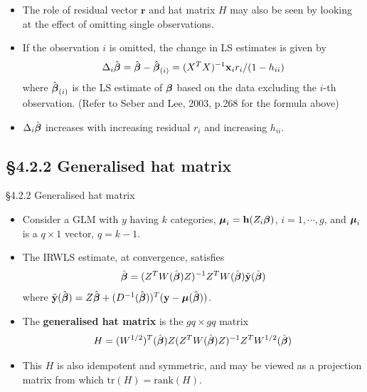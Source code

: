 \documentclass{beamer}
\newcommand{\currentsubsection}{}
\let\oldsubsection\subsection
\renewcommand{\subsection}[1]{\oldsubsection{#1}\renewcommand{\currentsubsection}{#1}}
\begin{document}
\begin{frame}
\begin{itemize}
\item
The role of residual vector $\textbf{r}$ and hat matrix $H$ may also be seen by looking at the effect of
omitting single observations.
\item
If the observation $i$ is omitted, the change in LS estimates is given by
$$\Delta_i\hat{\mbox{\boldmath $\beta$}}=\hat{\mbox{\boldmath $\beta$}}-\hat{\mbox{\boldmath $\beta$}}_{(i)}
=(X^TX)^{-1}\textbf{x}_ir_i/(1-h_{ii})$$
where $\hat{\mbox{\boldmath $\beta$}}_{(i)}$ is the LS estimate of $\mbox{\boldmath $\beta$}$ based on 
the data excluding the $i$-th observation. (Refer to Seber and Lee, 2003, p.268 for the formula above)
\item
$\Delta_i\hat{\mbox{\boldmath $\beta$}}$ increases with increasing residual $r_i$ and increasing $h_{ii}$.

\end{itemize}

\end{frame}

\subsection{\S4.2.2 Generalised hat matrix}
\begin{frame}{\S4.2.2 Generalised hat matrix}
\begin{itemize}
\item
Consider a GLM with $y$ having $k$ categories, $\mbox{\boldmath $\mu$}_i=\textbf{h}(Z_i\mbox{\boldmath $\beta$})$,
$i=1,\cdots,g$, and $\mbox{\boldmath $\mu$}_i$ is a $q\times 1$ vector, $q=k-1$.
\item
The IRWLS estimate, at convergence, satisfies
$$\hat{\mbox{\boldmath $\beta$}}=(Z^TW(\hat{\mbox{\boldmath $\beta$}})Z)^{-1}Z^TW(
\hat{\mbox{\boldmath $\beta$}})\tilde{\textbf{y}}(\hat{\mbox{\boldmath $\beta$}})$$
where $\tilde{\textbf{y}}(\hat{\mbox{\boldmath $\beta$}})=Z\hat{\mbox{\boldmath $\beta$}}
+(D^{-1}(\hat{\mbox{\boldmath $\beta$}}))^T(\textbf{y}-\mbox{\boldmath $\mu$}(\hat{\mbox{\boldmath $\beta$}}))$.
\end{itemize}
\end{frame}

\begin{frame}

\begin{itemize}
\item
The \textbf{generalised hat matrix} is the $gq\times gq$ matrix
$$H=(W^{1/2})^T(\hat{\mbox{\boldmath $\beta$}})Z(Z^TW(\hat{\mbox{\boldmath $\beta$}})Z)^{-1}
Z^TW^{1/2}(\hat{\mbox{\boldmath $\beta$}})$$
\item
This $H$ is also idempotent and symmetric, and may be viewed as a projection matrix from which
$\mbox{tr}(H)=\mbox{rank}(H)$.


\end{itemize}

\end{frame}
\end{document}
